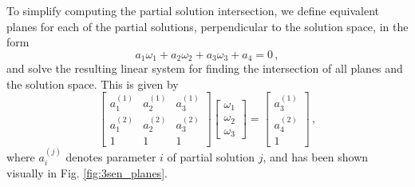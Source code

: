 \documentclass[letterpaper, 10 pt, journal, twoside]{ieeetran}  %
\begin{document}
To simplify computing the partial solution intersection, we define equivalent planes for each of the partial solutions, perpendicular to the solution space, in the form
\begin{equation}
   a_1\omega_1 + a_2\omega_2 +a_3\omega_3 + a_4 = 0\,, \label{eqn:3sen_plane_eq}
\end{equation}
and solve the resulting linear system for finding the intersection of all planes and the solution space. This is given by
\begin{equation}
   \begin{bmatrix}
      a_1^{(1)} & a_2^{(1)} & a_3^{(1)} \\
      a_1^{(2)} & a_2^{(2)} & a_3^{(2)} \\
      1 & 1 & 1
   \end{bmatrix}
   \begin{bmatrix}
      \omega_1 \\
      \omega_2 \\
      \omega_3
   \end{bmatrix}
   =
   \begin{bmatrix}
      a_3^{(1)} \\
      a_4^{(2)} \\
      1
   \end{bmatrix}\,, \label{eqn:3sen_plane_sol_eq}
\end{equation}
where $a_i^{(j)}$ denotes parameter $i$ of partial solution $j$, and has been shown visually in Fig. \ref{fig:3sen_planes}.
\end{document}
